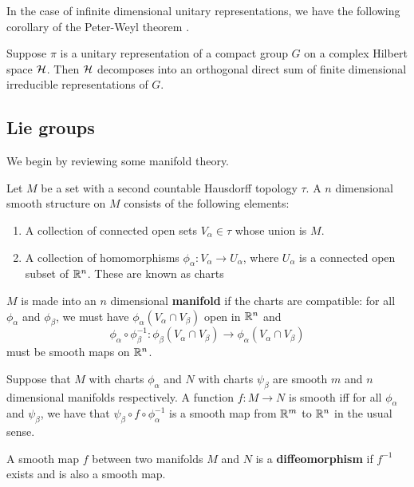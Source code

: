 \documentclass[a4paper]{article}
\begin{document}
In the case of infinite dimensional unitary representations, we have the following corollary of the Peter-Weyl theorem \cite{alex}.

\begin{prop}
    Suppose $\pi$ is a unitary representation of a compact group $G$ on a complex Hilbert space $\mathcal{H}$. Then $\mathcal{H}$ decomposes into an orthogonal direct sum of finite dimensional irreducible representations of $G$.
\end{prop}

\subsection{Lie groups}
We begin by reviewing some manifold theory.

\begin{defi}[Manifold]
    Let $M$ be a set with a second countable Hausdorff topology $\tau$. A $n$ dimensional smooth structure on $M$ consists of the following elements:
    \begin{enumerate}
        \item A collection of connected open sets $V_\alpha \in \tau$ whose union is $M$. 
        \item A collection of homomorphisms $\phi_\alpha : V_\alpha \to U_\alpha$, where $U_\alpha$ is a connected open subset of $\mathbb{R}^n$. These are known as charts
    \end{enumerate}
    $M$ is made into an $n$ dimensional \textbf{manifold} if the charts are compatible: for all $\phi_\alpha$ and $\phi_\beta$, we must have $\phi_\alpha(V_\alpha \cap V_\beta)$ open in $\mathbb{R}^n$ and $$\phi_\alpha \circ  \phi_\beta ^{-1}: \phi_\beta(V_\alpha \cap V_\beta) \to \phi_\alpha(V_\alpha \cap V_\beta)$$ must be smooth maps on $\mathbb{R}^n$.
\end{defi}

\begin{defi}
    Suppose that $M$ with charts $\phi_\alpha$ and $N$ with charts $\psi_\beta$ are smooth $m$ and $n$ dimensional manifolds respectively. A function $f: M \to N$ is smooth iff for all $\phi_\alpha$ and $\psi_\beta$, we have that $\psi_\beta \circ f \circ \phi_\alpha^{-1}$ is a smooth map from $\mathbb{R}^m$ to $\mathbb{R}^n$ in the usual sense.
\end{defi}

\begin{defi}[Diffeomorphism]
    A smooth map $f$ between two manifolds $M$ and $N$ is a \textbf{diffeomorphism} if $f^{-1}$ exists and is also a smooth map.
\end{defi}
\end{document}
